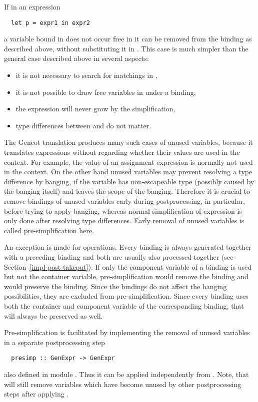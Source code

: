 If in an expression
\begin{verbatim}
  let p = expr1 in expr2
\end{verbatim}
a variable bound in  does not occur free in  it can be removed from the binding  as described above,
without substituting it in . This case is much simpler than the general case described above in several aspects:
\begin{itemize}
\item it is not necessary to search for matchings in ,
\item it is not possible to draw free variables in  under a binding,
\item the expression will never grow by the simplification,
\item type differences between  and  do not matter.
\end{itemize}

The Gencot translation produces many such cases of unused variables, because it translates expressions without regarding whether
their values are used in the context. For example, the value of an assignment expression is normally not used in the context. On the
other hand unused variables may prevent resolving a type difference by banging, if the variable has non-escapeable type (possibly
caused by the banging itself) and leaves the scope of the banging. Therefore it is crucial to remove bindings of unused variables
early during postprocessing, in particular, before trying to apply banging, whereas normal simplification of  expression
is only done after resolving type differences. Early removal of unused variables is called pre-simplification here.

An exception is made for  operations. Every  binding is always generated together with a preceding 
binding and both are usually also processed together (see Section~\ref{impl-post-takeput}). If only the component variable of a
 binding is used but not the container variable, pre-simplification would remove the  binding and would preserve
the  binding. Since the  bindings do not affect the banging possibilities, they are excluded from
pre-simplification. Since every  binding uses both the container and component variable of the corresponding 
binding, that will always be preserved as well.

Pre-simplification is facilitated by implementing the removal of unused variables in a separate postprocessing step
\begin{verbatim}
  presimp :: GenExpr -> GenExpr
\end{verbatim}
also defined in module . Thus it can be applied independently from . Note, that
 will still remove variables which have become unused by other postprocessing steps after applying .

